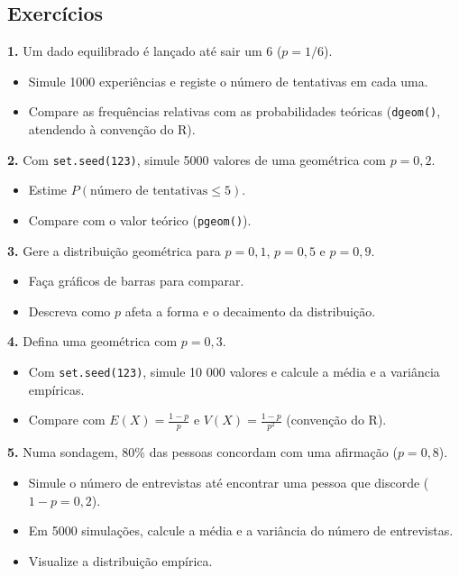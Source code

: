 \documentclass[
  portuguese,
  11pt,
  openany]{book}
\providecommand{\tightlist}{%
  \setlength{\itemsep}{0pt}\setlength{\parskip}{0pt}}
\begin{document}
\subsection{Exercícios}\label{exercuxedcios-28}

\textbf{1.} Um dado equilibrado é lançado até sair um 6 (\(p = 1/6\)).

\begin{itemize}
\tightlist
\item
  Simule 1000 experiências e registe o número de tentativas em cada uma.
\item
  Compare as frequências relativas com as probabilidades teóricas (\texttt{dgeom()}, atendendo
  à convenção do R).
\end{itemize}

\textbf{2.} Com \texttt{set.seed(123)}, simule 5000 valores de uma geométrica com \(p = 0{,}2\).

\begin{itemize}
\tightlist
\item
  Estime \(P(\text{número de tentativas} \leq 5)\).
\item
  Compare com o valor teórico (\texttt{pgeom()}).
\end{itemize}

\textbf{3.} Gere a distribuição geométrica para \(p = 0{,}1\), \(p = 0{,}5\) e \(p = 0{,}9\).

\begin{itemize}
\tightlist
\item
  Faça gráficos de barras para comparar.
\item
  Descreva como \(p\) afeta a forma e o decaimento da distribuição.
\end{itemize}

\textbf{4.} Defina uma geométrica com \(p = 0{,}3\).

\begin{itemize}
\tightlist
\item
  Com \texttt{set.seed(123)}, simule 10 000 valores e calcule a média e a variância empíricas.
\item
  Compare com \(E(X) = \frac{1-p}{p}\) e \(V(X) = \frac{1-p}{p^2}\) (convenção do R).
\end{itemize}

\textbf{5.} Numa sondagem, 80\% das pessoas concordam com uma afirmação (\(p = 0{,}8\)).

\begin{itemize}
\tightlist
\item
  Simule o número de entrevistas até encontrar uma pessoa que discorde (\(1 - p = 0{,}2\)).
\item
  Em 5000 simulações, calcule a média e a variância do número de entrevistas.
\item
  Visualize a distribuição empírica.
\end{itemize}
\end{document}
